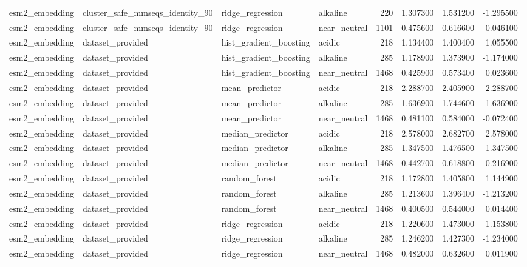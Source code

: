 \begin{longtable}{llllrrrr}
esm2\_embedding & cluster\_safe\_mmseqs\_identity\_90 & ridge\_regression & alkaline & 220 & 1.307300 & 1.531200 & -1.295500 \\
esm2\_embedding & cluster\_safe\_mmseqs\_identity\_90 & ridge\_regression & near\_neutral & 1101 & 0.475600 & 0.616600 & 0.046100 \\
esm2\_embedding & dataset\_provided & hist\_gradient\_boosting & acidic & 218 & 1.134400 & 1.400400 & 1.055500 \\
esm2\_embedding & dataset\_provided & hist\_gradient\_boosting & alkaline & 285 & 1.178900 & 1.373900 & -1.174000 \\
esm2\_embedding & dataset\_provided & hist\_gradient\_boosting & near\_neutral & 1468 & 0.425900 & 0.573400 & 0.023600 \\
esm2\_embedding & dataset\_provided & mean\_predictor & acidic & 218 & 2.288700 & 2.405900 & 2.288700 \\
esm2\_embedding & dataset\_provided & mean\_predictor & alkaline & 285 & 1.636900 & 1.744600 & -1.636900 \\
esm2\_embedding & dataset\_provided & mean\_predictor & near\_neutral & 1468 & 0.481100 & 0.584000 & -0.072400 \\
esm2\_embedding & dataset\_provided & median\_predictor & acidic & 218 & 2.578000 & 2.682700 & 2.578000 \\
esm2\_embedding & dataset\_provided & median\_predictor & alkaline & 285 & 1.347500 & 1.476500 & -1.347500 \\
esm2\_embedding & dataset\_provided & median\_predictor & near\_neutral & 1468 & 0.442700 & 0.618800 & 0.216900 \\
esm2\_embedding & dataset\_provided & random\_forest & acidic & 218 & 1.172800 & 1.405800 & 1.144900 \\
esm2\_embedding & dataset\_provided & random\_forest & alkaline & 285 & 1.213600 & 1.396400 & -1.213200 \\
esm2\_embedding & dataset\_provided & random\_forest & near\_neutral & 1468 & 0.400500 & 0.544000 & 0.014400 \\
esm2\_embedding & dataset\_provided & ridge\_regression & acidic & 218 & 1.220600 & 1.473000 & 1.153800 \\
esm2\_embedding & dataset\_provided & ridge\_regression & alkaline & 285 & 1.246200 & 1.427300 & -1.234000 \\
esm2\_embedding & dataset\_provided & ridge\_regression & near\_neutral & 1468 & 0.482000 & 0.632600 & 0.011900 \\

\end{longtable}
